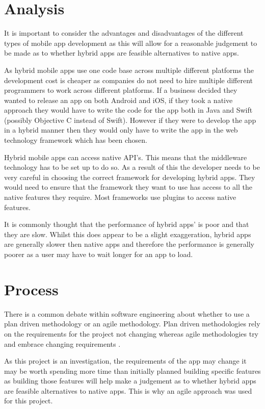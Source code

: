 \section{Analysis}
It is important to consider the advantages and disadvantages of the different types of mobile app development as this will allow for a reasonable judgement to be made as to whether hybrid apps are feasible alternatives to native apps.

As hybrid mobile apps use one code base across multiple different platforms the development cost is cheaper as companies do not need to hire multiple different programmers to work across different platforms. If a business decided they wanted to release an app on both Android and iOS, if they took a native approach they would have to write the code for the app both in Java and Swift (possibly Objective C instead of Swift). However if they were to develop the app in a hybrid manner then they would only have to write the app in the web technology framework which has been chosen.

Hybrid mobile apps can access native API's. This means that the middleware technology has to be set up to do so. As a result of this the developer needs to be very careful in choosing the correct framework for developing hybrid apps. They would need to ensure that the framework they want to use has access to all the native features they require. Most frameworks use plugins to access native features.

It is commonly thought that the performance of hybrid apps' is poor and that they are slow. Whilst this does appear to be a slight exaggeration, hybrid apps are generally slower then native apps and therefore the performance is generally poorer as a user may have to wait longer for an app to load.


\section{Process}
There is a common debate within software engineering about whether to use a plan driven methodology or an agile methodology. Plan driven methodologies rely on the requirements for the project not changing whereas agile methodologies try and embrace changing requirements \cite{Agile}.

As this project is an investigation, the requirements of the app may change it may be worth spending more time than initially planned building specific features as building those features will help make a judgement as to whether hybrid apps are feasible alternatives to native apps. This is why an agile approach was used for this project.

